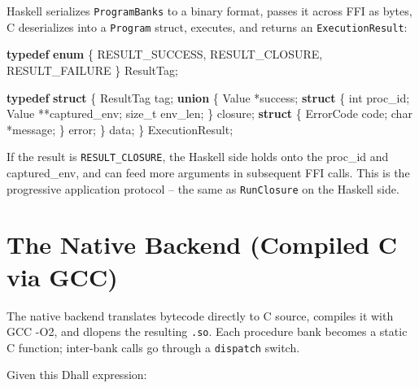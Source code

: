 \documentclass[]{article}
\newenvironment{Shaded}{}{}
\newcommand{\DataTypeTok}[1]{\textcolor[rgb]{0.56,0.13,0.00}{#1}}
\newcommand{\KeywordTok}[1]{\textcolor[rgb]{0.00,0.44,0.13}{\textbf{#1}}}
\newcommand{\NormalTok}[1]{#1}
\newcommand{\OperatorTok}[1]{\textcolor[rgb]{0.40,0.40,0.40}{#1}}
\begin{document}
Haskell serializes \texttt{ProgramBanks} to a binary format, passes it across
FFI as bytes, C deserializes into a \texttt{Program} struct, executes, and
returns an \texttt{ExecutionResult}:

\begin{Shaded}
\begin{Highlighting}[]
\KeywordTok{typedef} \KeywordTok{enum} \OperatorTok{\{}\NormalTok{ RESULT\_SUCCESS}\OperatorTok{,}\NormalTok{ RESULT\_CLOSURE}\OperatorTok{,}\NormalTok{ RESULT\_FAILURE }\OperatorTok{\}}\NormalTok{ ResultTag}\OperatorTok{;}

\KeywordTok{typedef} \KeywordTok{struct} \OperatorTok{\{}
\NormalTok{  ResultTag tag}\OperatorTok{;}
  \KeywordTok{union} \OperatorTok{\{}
\NormalTok{    Value }\OperatorTok{*}\NormalTok{success}\OperatorTok{;}
    \KeywordTok{struct} \OperatorTok{\{} \DataTypeTok{int}\NormalTok{ proc\_id}\OperatorTok{;}\NormalTok{ Value }\OperatorTok{**}\NormalTok{captured\_env}\OperatorTok{;} \DataTypeTok{size\_t}\NormalTok{ env\_len}\OperatorTok{;} \OperatorTok{\}}\NormalTok{ closure}\OperatorTok{;}
    \KeywordTok{struct} \OperatorTok{\{}\NormalTok{ ErrorCode code}\OperatorTok{;} \DataTypeTok{char} \OperatorTok{*}\NormalTok{message}\OperatorTok{;} \OperatorTok{\}}\NormalTok{ error}\OperatorTok{;}
  \OperatorTok{\}}\NormalTok{ data}\OperatorTok{;}
\OperatorTok{\}}\NormalTok{ ExecutionResult}\OperatorTok{;}
\end{Highlighting}
\end{Shaded}

If the result is \texttt{RESULT\_CLOSURE}, the Haskell side holds onto the
proc\_id and captured\_env, and can feed more arguments in subsequent FFI calls.
This is the progressive application protocol -- the same as \texttt{RunClosure}
on the Haskell side.

\section{The Native Backend (Compiled C via
GCC)}\label{the-native-backend-compiled-c-via-gcc}

The native backend translates bytecode directly to C source, compiles it with
GCC -O2, and dlopens the resulting \texttt{.so}. Each procedure bank becomes a
static C function; inter-bank calls go through a \texttt{dispatch} switch.

Given this Dhall expression:
\end{document}
